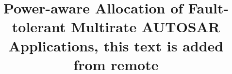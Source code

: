 \documentclass[review]{elsarticle}
\begin{document}
\title{Power-aware Allocation of Fault-tolerant Multirate AUTOSAR Applications, this text is added from remote}
%
%
%

\maketitle



%











% 
% 
\end{document}
